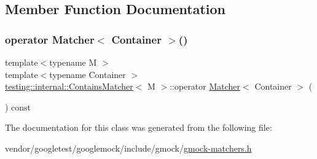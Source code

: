 \subsection{Member Function Documentation}
\mbox{\label{classtesting_1_1internal_1_1_contains_matcher_a18ed41b23e9d1cbc9c810baef7cf98a1}} 
\subsubsection{\texorpdfstring{operator Matcher$<$ Container $>$()}{operator Matcher< Container >()}}
{\footnotesize\ttfamily template$<$typename M $>$ \\
template$<$typename Container $>$ \\
\hyperlink{classtesting_1_1internal_1_1_contains_matcher}{testing\+::internal\+::\+Contains\+Matcher}$<$ M $>$\+::operator \hyperlink{classtesting_1_1_matcher}{Matcher}$<$ Container $>$ (\begin{DoxyParamCaption}{ }\end{DoxyParamCaption}) const\hspace{0.3cm}{\ttfamily [inline]}}



The documentation for this class was generated from the following file\+:\begin{DoxyCompactItemize}
\item 
vendor/googletest/googlemock/include/gmock/\hyperlink{gmock-matchers_8h}{gmock-\/matchers.\+h}\end{DoxyCompactItemize}
